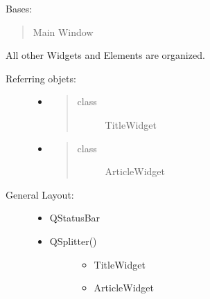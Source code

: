 \documentclass[letterpaper,10pt,english]{sphinxmanual}
\begin{document}
\begin{fulllineitems}
\label{\detokenize{anfrss.gui:anfrss.gui.guiapp.ANFApp}}
Bases: 
\begin{quote}

Main Window
\end{quote}

All other Widgets and
Elements are organized.
\begin{description}
\item[{Referring objets:}] \leavevmode\begin{itemize}
\item {} \begin{quote}\begin{description}
\item[{class}] \leavevmode
TitleWidget

\end{description}\end{quote}

\item {} \begin{quote}\begin{description}
\item[{class}] \leavevmode
ArticleWidget

\end{description}\end{quote}

\end{itemize}

\item[{General Layout:}] \leavevmode\begin{itemize}
\item {} 
QStatusBar

\item {} \begin{description}
\item[{QSplitter()}] \leavevmode\begin{itemize}
\item {} 
TitleWidget

\item {} 
ArticleWidget

\end{itemize}

\end{description}


\end{itemize}
\end{description}
\end{fulllineitems}
\end{document}
